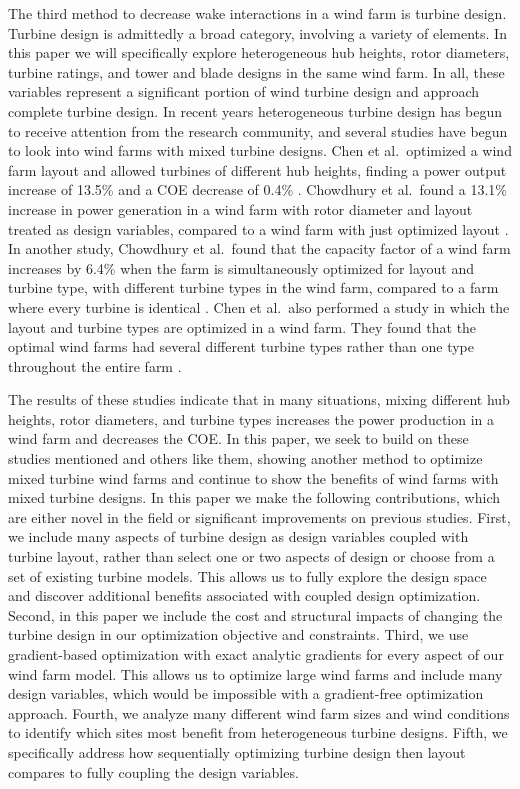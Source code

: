 The third method to decrease wake interactions in a wind farm is turbine design. Turbine design is admittedly a broad category, involving a variety of elements. In this paper we will specifically explore heterogeneous hub heights, rotor diameters, turbine ratings, and tower and blade designs in the same wind farm. In all, these variables represent a significant portion of wind turbine design and approach complete turbine design. 
In recent years heterogeneous turbine design has begun to receive attention from the research community, and several studies have begun to look into wind farms with mixed turbine designs. Chen et al.~optimized
a wind farm layout and allowed turbines of different hub heights, finding a power output increase of 13.5\% and a COE decrease of 0.4\% \citep{chen2013wind}. Chowdhury et al.~found
a 13.1\% increase in power generation in a wind farm with rotor diameter and layout treated as design variables, compared to a wind farm with just optimized layout \citep{chowdhury2010optimizing}. In another study, Chowdhury et al.~found that the capacity factor of a wind farm increases by 6.4\% when the farm is simultaneously optimized for layout and turbine type, with different turbine types in the wind farm, compared to a farm where every turbine is identical \citep{chowdhury2013optimizing}. Chen et al.~also performed a study in which the layout and turbine types are optimized in a wind farm. They found that the optimal wind farms had several different turbine types rather than one type throughout the entire farm \citep{chen2015multi}.

The results of these studies indicate that in many situations, mixing different hub heights, rotor diameters, and turbine types increases the power production in a wind farm and decreases the COE. In this paper, we seek to build on these studies mentioned and others like them, showing another method to optimize mixed turbine wind farms and continue to show the benefits of wind farms with mixed turbine designs. In this paper we make the following contributions, which are either novel in the field or significant improvements on previous studies.
First, we include many aspects of turbine design as design variables coupled with turbine layout, rather than select one or two aspects of design or choose from a set of existing turbine models. This allows us to fully explore the design space and discover additional benefits associated with coupled design optimization.
Second, in this paper we include the cost and structural impacts of changing the turbine design in our optimization objective and constraints.
Third, we use gradient-based optimization with exact analytic gradients for every aspect of our wind farm model. This allows us to optimize large wind farms and include many design variables, which would be impossible with a gradient-free optimization approach.
Fourth, we analyze many different wind farm sizes and wind conditions to identify which sites most benefit from heterogeneous turbine designs.
Fifth, we specifically address how sequentially optimizing turbine design then layout compares to fully coupling the design variables.



